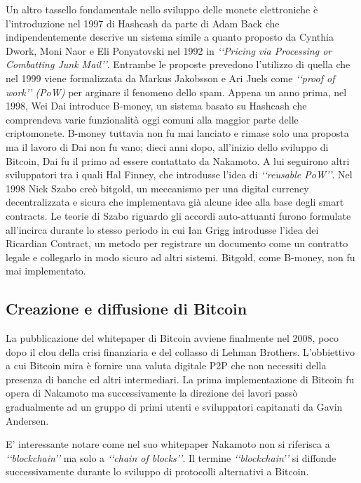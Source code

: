 Un altro tassello fondamentale nello sviluppo delle monete elettroniche è l’introduzione nel 1997 di Hashcash\cite{K9} da parte di Adam Back che indipendentemente descrive un sistema simile a quanto proposto da Cynthia Dwork,  Moni Naor e Eli Ponyatovski nel 1992 in \textit{‘‘Pricing via Processing or Combatting Junk Mail’’}\cite{K10}. Entrambe le proposte prevedono l’utilizzo di quella che nel 1999 viene formalizzata da  Markus Jakobsson e Ari Juels come \textit{‘‘proof of work’’ (PoW)} per arginare il fenomeno dello spam\cite{K11}. Appena un anno prima, nel 1998, Wei Dai introduce B-money\cite{K12}, un sistema basato su Hashcash che comprendeva varie funzionalità oggi comuni alla maggior parte delle criptomonete. B-money tuttavia non fu mai lanciato e rimase solo una proposta ma il lavoro di Dai non fu vano; dieci anni dopo, all'inizio dello sviluppo di Bitcoin, Dai fu il primo ad essere contattato da Nakamoto. A lui seguirono altri sviluppatori tra i quali Hal Finney, che introdusse l'idea di \textit{‘‘reusable PoW’’}\cite{K13}. Nel 1998 Nick Szabo creò bitgold\cite{K14}, un meccanismo per una digital currency decentralizzata e sicura che implementava già alcune idee alla base degli smart contracts. Le teorie di Szabo riguardo gli accordi auto-attuanti furono formulate all'incirca durante lo stesso periodo in cui Ian Grigg introdusse l'idea dei Ricardian Contract, un metodo per registrare un documento come un contratto legale e collegarlo in modo sicuro ad altri sistemi\cite{K15}. Bitgold, come B-money, non fu mai implementato.

\subsection{Creazione e diffusione di Bitcoin}

La pubblicazione del whitepaper di Bitcoin avviene finalmente nel 2008, poco dopo il clou della crisi finanziaria e del collasso di Lehman Brothers. L'obbiettivo a cui Bitcoin mira è fornire una valuta digitale P2P che non necessiti della presenza di banche ed altri intermediari.  La prima implementazione di Bitcoin fu opera di Nakamoto ma successivamente la direzione dei lavori passò gradualmente ad un gruppo di primi utenti e sviluppatori capitanati da Gavin Andersen. 

E' interessante notare come nel suo whitepaper\cite{K1} Nakamoto non si riferisca a \textit{‘‘blockchain’’} ma solo a \textit{‘‘chain of blocks’’}. Il termine \textit{‘‘blockchain’’} si diffonde successivamente durante lo sviluppo di protocolli alternativi a Bitcoin. 

